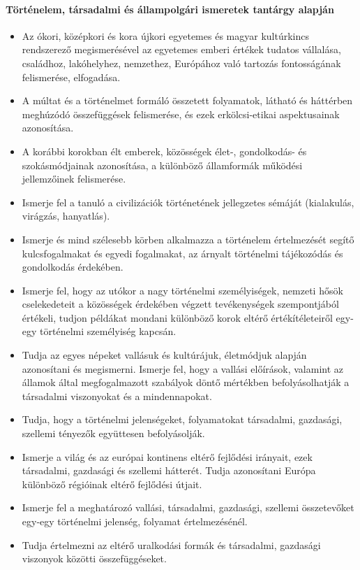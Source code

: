 \paragraph{Történelem, társadalmi és állampolgári ismeretek tantárgy alapján}
\begin{itemize}
\item Az ókori, középkori és kora újkori egyetemes és magyar kultúrkincs rendszerező megismerésével az egyetemes emberi értékek tudatos vállalása, családhoz, lakóhelyhez, nemzethez, Európához való tartozás fontosságának felismerése, elfogadása.
\item A múltat és a történelmet formáló összetett folyamatok, látható és háttérben meghúzódó összefüggések felismerése, és ezek erkölcsi-etikai aspektusainak azonosítása.
\item A korábbi korokban élt emberek, közösségek élet-, gondolkodás- és szokásmódjainak azonosítása, a különböző államformák működési jellemzőinek felismerése.
\item Ismerje fel a tanuló a civilizációk történetének jellegzetes sémáját (kialakulás, virágzás, hanyatlás).
\item Ismerje és mind szélesebb körben alkalmazza a történelem értelmezését segítő kulcsfogalmakat és egyedi fogalmakat, az árnyalt történelmi tájékozódás és gondolkodás érdekében.
\item Ismerje fel, hogy az utókor a nagy történelmi személyiségek, nemzeti hősök cselekedeteit a közösségek érdekében végzett tevékenységek szempontjából értékeli, tudjon példákat mondani különböző korok eltérő értékítéleteiről egy-egy történelmi személyiség kapcsán.
\item Tudja az egyes népeket vallásuk és kultúrájuk, életmódjuk alapján azonosítani és megismerni. Ismerje fel, hogy a vallási előírások, valamint az államok által megfogalmazott szabályok döntő mértékben befolyásolhatják a társadalmi viszonyokat és a mindennapokat.
\item Tudja, hogy a történelmi jelenségeket, folyamatokat társadalmi, gazdasági, szellemi tényezők együttesen befolyásolják.
\item Ismerje a világ és az európai kontinens eltérő fejlődési irányait, ezek társadalmi, gazdasági és szellemi hátterét. Tudja azonosítani Európa különböző régióinak eltérő fejlődési útjait.
\item Ismerje fel a meghatározó vallási, társadalmi, gazdasági, szellemi összetevőket egy-egy történelmi jelenség, folyamat értelmezésénél.
\item Tudja értelmezni az eltérő uralkodási formák és társadalmi, gazdasági viszonyok közötti összefüggéseket.

\end{itemize}
